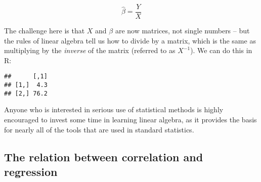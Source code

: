 \documentclass[]{book}
\newenvironment{Shaded}{\begin{snugshade}}{\end{snugshade}}
\newcommand{\KeywordTok}[1]{\textcolor[rgb]{0.13,0.29,0.53}{\textbf{#1}}}
\newcommand{\DataTypeTok}[1]{\textcolor[rgb]{0.13,0.29,0.53}{#1}}
\newcommand{\DecValTok}[1]{\textcolor[rgb]{0.00,0.00,0.81}{#1}}
\newcommand{\StringTok}[1]{\textcolor[rgb]{0.31,0.60,0.02}{#1}}
\newcommand{\CommentTok}[1]{\textcolor[rgb]{0.56,0.35,0.01}{\textit{#1}}}
\newcommand{\OperatorTok}[1]{\textcolor[rgb]{0.81,0.36,0.00}{\textbf{#1}}}
\newcommand{\NormalTok}[1]{#1}
\theoremstyle{definition}
\theoremstyle{definition}
\theoremstyle{definition}
\theoremstyle{remark}
\begin{document}
\[
\hat{\beta} = \frac{Y}{X}
\]

The challenge here is that \(X\) and \(\beta\) are now matrices, not
single numbers -- but the rules of linear algebra tell us how to divide
by a matrix, which is the same as multiplying by the \emph{inverse} of
the matrix (referred to as \(X^{-1}\)). We can do this in R:

\begin{Shaded}
\end{Shaded}

\begin{verbatim}
##      [,1]
## [1,]  4.3
## [2,] 76.2
\end{verbatim}

Anyone who is interested in serious use of statistical methods is highly
encouraged to invest some time in learning linear algebra, as it
provides the basis for nearly all of the tools that are used in standard
statistics.

\subsection{The relation between correlation and
regression}\label{the-relation-between-correlation-and-regression}
\end{document}
